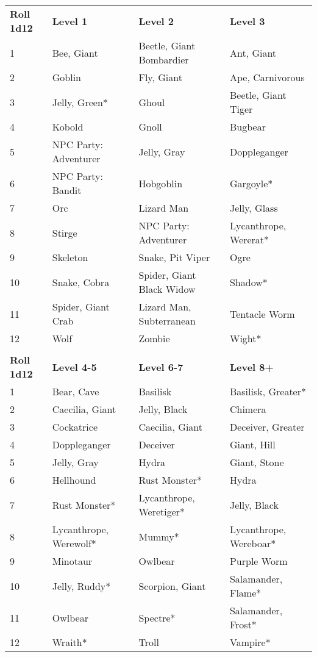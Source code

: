 \documentclass[a4paper,twoside,openany,10pt]{book}
\begin{document}
\begin{tabular*}{1\linewidth}{@{\extracolsep{\fill}}llll}
\textbf{Roll 1d12} & \textbf{Level 1} & \textbf{Level 2} & \textbf{Level 3} \\
1 & Bee, Giant & Beetle, Giant Bombardier & Ant, Giant \\\toprule
2 & Goblin & Fly, Giant & Ape, Carnivorous \\\hline
3 & Jelly, Green* & Ghoul & Beetle, Giant Tiger \\\hline
4 & Kobold & Gnoll & Bugbear \\\hline
5 & NPC Party: Adventurer & Jelly, Gray & Doppleganger \\\hline
6 & NPC Party: Bandit & Hobgoblin & Gargoyle* \\\hline
7 & Orc & Lizard Man & Jelly, Glass \\\hline
8 & Stirge & NPC Party: Adventurer & Lycanthrope, Wererat* \\\hline
9 & Skeleton & Snake, Pit Viper & Ogre \\\hline
10 & Snake, Cobra & Spider, Giant Black Widow & Shadow* \\\hline
11 & Spider, Giant Crab & Lizard Man, Subterranean & Tentacle Worm \\\hline
12 & Wolf & Zombie & Wight* \\\bottomrule
& & & \\\hline
\textbf{Roll 1d12} & \textbf{Level 4-5} & \textbf{Level 6-7} & \textbf{Level 8+} \\
1 & Bear, Cave & Basilisk & Basilisk, Greater* \\\hline
2 & Caecilia, Giant & Jelly, Black & Chimera \\\hline
3 & Cockatrice & Caecilia, Giant & Deceiver, Greater \\\hline
4 & Doppleganger & Deceiver & Giant, Hill \\\hline
5 & Jelly, Gray & Hydra & Giant, Stone \\\hline
6 & Hellhound & Rust Monster* & Hydra \\\hline
7 & Rust Monster* & Lycanthrope, Weretiger* & Jelly, Black \\\hline
8 & Lycanthrope, Werewolf* & Mummy* & Lycanthrope, Wereboar* \\\hline
9 & Minotaur & Owlbear & Purple Worm \\\hline
10 & Jelly, Ruddy* & Scorpion, Giant & Salamander, Flame* \\\hline
11 & Owlbear & Spectre* & Salamander, Frost* \\\hline
12 & Wraith* & Troll & Vampire* \\\hline
\end{tabular*}
\end{document}
